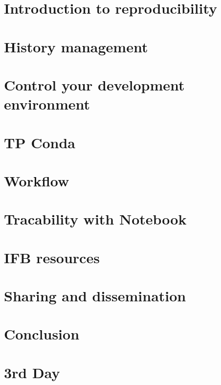 \documentclass{beamer}
\begin{document}
\section[Introduction]{Introduction to reproducibility}

\label{History}
\section[History]{History management}

\label{Encapsulation}
\section[Encapsulation]{Control your development environment}

\label{Software_Environment}
\section[Environment]{TP Conda}

\label{Workflow}
\section[Pipeline]{Workflow}

\label{Notebooks}
\section{Tracability with Notebook}

\label{IFB}
\section[IFB]{IFB resources}

\label{Sharing}
\section{Sharing and dissemination}

\label{Conclusion}
\section{Conclusion}

\label{Brain storming}
\section{3rd Day}

\end{document}
